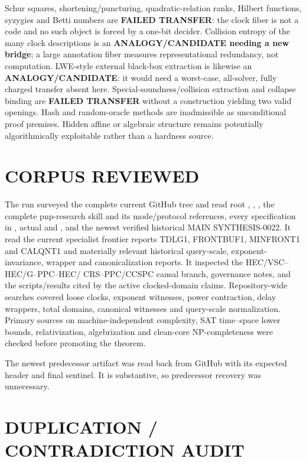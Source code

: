 \documentclass[11pt]{article}
\begin{document}
Schur squares, shortening/puncturing, quadratic-relation ranks, Hilbert
functions, syzygies and Betti numbers are \textbf{FAILED TRANSFER}: the
clock fiber is not a code and no such object is forced by a one-bit decider.
Collision entropy of the many clock descriptions is an
\textbf{ANALOGY/CANDIDATE needing a new bridge}; a large annotation fiber
measures representational redundancy, not computation.  LWE-style external
black-box extraction is likewise an \textbf{ANALOGY/CANDIDATE}: it would
need a worst-case, all-solver, fully charged transfer absent here.
Special-soundness/collision extraction and collapse binding are
\textbf{FAILED TRANSFER} without a construction yielding two valid openings.
Hash and random-oracle methods are inadmissible as unconditional proof
premises.  Hidden affine or algebraic structure remains potentially
algorithmically exploitable rather than a hardness source.

\section{CORPUS REVIEWED}

The run surveyed the complete current GitHub tree and read root
, , , the complete
pnp-research skill and its mode/protocol references, every specification in
, actual  and , and the newest
verified historical MAIN SYNTHESIS-0022.  It read the current specialist
frontier reports TDLG1, FRONTBUF1, MINFRONT1 and CALQNT1 and materially
relevant historical query-scale, exponent-invariance, wrapper and
canonicalization reports.  It inspected the HEC/VSC--HEC/G--PPC--HEC/
CRS--PPC/CCSPC causal branch, governance notes, and the scripts/results cited
by the active clocked-domain claims.  Repository-wide searches covered loose
clocks, exponent witnesses, power contraction, delay wrappers, total domains,
canonical witnesses and query-scale normalization.  Primary sources on
machine-independent complexity, SAT time--space lower bounds,
relativization, algebrization and clean-core NP-completeness were checked
before promoting the theorem.

The newest predecessor artifact
 was read back
from GitHub with its expected header and final sentinel.  It is substantive,
so predecessor recovery was unnecessary.

\section{DUPLICATION / CONTRADICTION AUDIT}
\end{document}
